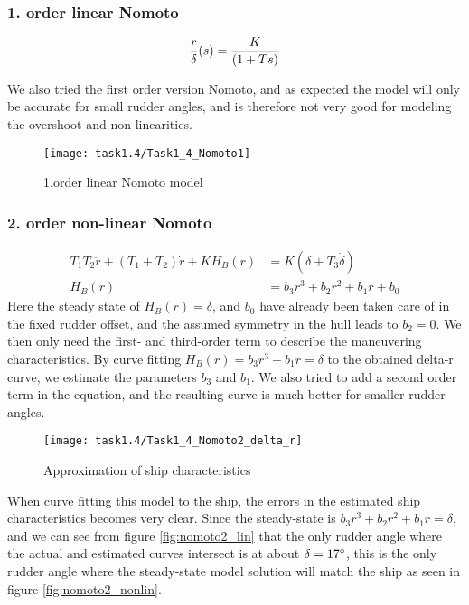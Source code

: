 \newpage
\subsubsection*{1. order linear Nomoto}

\begin{equation}
	\frac{r}{\delta}(s) = \frac{K}{(1+Ts) } \\
\end{equation}

We also tried the first order version Nomoto, and as expected the model will only be accurate for small rudder angles, and is therefore not very good for modeling the overshoot and non-linearities.

\begin{figure}[H]
    \centering
    \texttt{[image: task1.4/Task1\_4\_Nomoto1]}
    \caption{1.order linear Nomoto model}
    \label{fig:nomoto1_lin}
\end{figure}

\newpage
\subsubsection*{2. order non-linear Nomoto}
\begin{equation}
\begin{split}
	T_1 T_2 \ddot{r} + (T_1 + T_2)\dot{r} + KH_B(r) &= K(\delta + T_3\dot{\delta}) \\
	H_B(r) &= b_3r^3 + b_2r^2 + b_1r + b_0
\end{split}
\end{equation}
Here the steady state of $H_B(r)=\delta$, and $b_0$ have already been taken care of in the fixed rudder offset, and the assumed symmetry in the hull leads to $b_2 = 0$. We then only need the first- and third-order term to describe the maneuvering characteristics. By curve fitting $H_B(r)=b_3r^3 + b_1r=\delta$ to the obtained delta-r curve, we estimate the parameters $b_3$ and $b_1$. We also tried to add a second order term in the equation, and the resulting curve is much better for smaller rudder angles.
\begin{figure}[H]
    \centering
    \texttt{[image: task1.4/Task1\_4\_Nomoto2\_delta\_r]}
    \caption{Approximation of ship characteristics}
    \label{fig:nomoto2_delta_r}
\end{figure}

When curve fitting this model to the ship, the errors in the estimated ship characteristics becomes very clear. Since the steady-state is $b_3 r^3 + b_2 r^2 + b_1 r = \delta$, and we can see from figure \ref{fig:nomoto2_lin} that the only rudder angle where the actual and estimated curves intersect is at about $\delta = 17\degree$, this is the only rudder angle where the steady-state model solution will match the ship as seen in figure \ref{fig:nomoto2_nonlin}.
    
